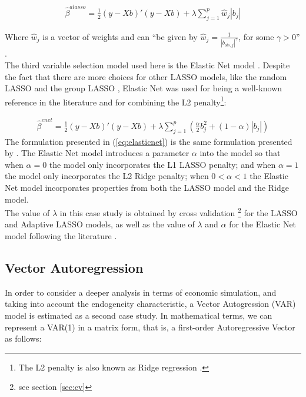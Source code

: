 \begin{align} \label{eq:lassoadaptive}
    \hat{\beta}^{alasso} = \frac{1}{2}(y - Xb)'(y - Xb) + \lambda\sum_{j=1}^p\hat{w}_j |b_j|
\end{align}

Where $\hat{w}_j$ is a vector of weights and can ``be given by $\hat{w}_j = \frac{1}{|b_{ols, j}|^\gamma}$, for some $ \gamma > 0$'' \cite[p. 115]{hoornweg2018science}.\\

The third variable selection model used here is the Elastic Net model \cite[]{zou2005regularization}. Despite the fact that there are more choices for other LASSO models, like the random LASSO \cite[]{wang2011random} and the group LASSO \cite[]{yuan2006model}, Elastic Net was used for being a well-known reference in the literature and for combining the L2 penalty\footnote{The L2 penalty is also known as Ridge regression \cite[p.2]{owen2007robust}.}:

\begin{align}\label{eq:elasticnet}
    \hat{\beta}^{enet} = \frac{1}{2}(y - Xb)'(y - Xb) + \lambda\sum_{j=1}^p\left(\frac{\alpha}{2}b_j ^2 + (1 - \alpha)|b_j|\right)
\end{align}
The formulation presented in (\ref{eq:elasticnet}) is the same formulation presented by \cite{hastie2009elements}. The Elastic Net model introduces a parameter $\alpha$ into the model so that when $\alpha = 0$ the model only incorporates the L1 LASSO penalty; and when $\alpha = 1$ the model only incorporates the L2 Ridge penalty; when $0 < \alpha < 1$ the Elastic Net model incorporates properties from both the LASSO model and the Ridge model.\\

The value of $\lambda$ in this case study is obtained by cross validation \footnote{see section \ref{sec:cv}} for the LASSO and Adaptive LASSO models, as well as the value of $\lambda$ and $\alpha $ for the Elastic Net model following the literature \cite[p. 136]{hoornweg2018science}.

\subsection{Vector Autoregression}

In order to consider a deeper analysis in terms of economic simulation, and taking into account the endogeneity characteristic, a Vector Autogression (VAR) model is estimated as a second case study. In mathematical terms, we can represent a VAR(1) in a matrix form, that is, a first-order Autoregressive Vector as follows:

